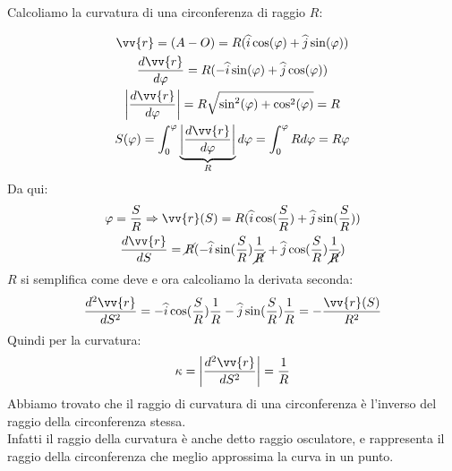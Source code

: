 \documentclass[a4paper, oneside]{article}
\begin{document}
\begin{example}
    Calcoliamo la curvatura di una circonferenza di raggio $R$:
    \begin{center}
    \end{center}
    \begin{gather*}
        \vv{r} = (A - O) = R (\widehat{i} \cos(\varphi) + \widehat{j} \sin(\varphi))\\
        \frac{d\vv{r}}{d\varphi} = R (-\widehat{i} \sin(\varphi) + \widehat{j} \cos(\varphi))\\
        \left\lvert \frac{d\vv{r}}{d \varphi} \right\rvert = R \sqrt{\sin^2(\varphi) + \cos^2(\varphi)} = R\\
        S(\varphi) = \int_{0}^{\varphi} \underbrace{\left\lvert \frac{d\vv{r}}{d\varphi} \right\rvert}_{R} d\varphi = \int_{0}^{\varphi} R d\varphi = R \varphi\\
    \end{gather*}
    Da qui:
    \begin{gather*}
        \varphi = \frac{S}{R} \Rightarrow \vv{r}(S) = R (\widehat{i} \cos(\frac{S}{R}) + \widehat{j} \sin(\frac{S}{R}))\\
        \frac{d\vv{r}}{dS} = \cancel{R} (-\widehat{i} \sin(\frac{S}{R}) \frac{1}{\cancel{R}}+ \widehat{j} \cos(\frac{S}{R}) \frac{1}{\cancel{R}})\\
    \end{gather*}
    $R$ si semplifica come deve e ora calcoliamo la derivata seconda:
    \begin{gather*}
        \frac{d^2 \vv{r}}{dS^2} = -\widehat{i} \cos(\frac{S}{R}) \frac{1}{R} - \widehat{j} \sin(\frac{S}{R}) \frac{1}{R} = -\frac{\vv{r}(S)}{R^2}
    \end{gather*}
    Quindi per la curvatura:
    \begin{gather*}
        \kappa = \left\lvert \frac{d^2 \vv{r}}{dS^2} \right\rvert = \frac{1}{R}
    \end{gather*}
    Abbiamo trovato che il raggio di curvatura di una circonferenza è l'inverso del raggio della circonferenza stessa.\\
    Infatti il raggio della curvatura è anche detto raggio osculatore, e rappresenta il raggio della circonferenza che meglio approssima la curva in un punto.
\end{example}
\end{document}
